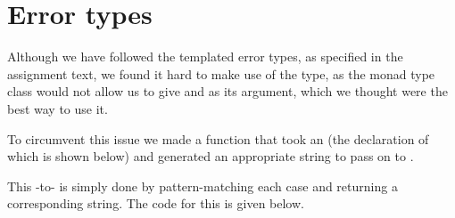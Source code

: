 \section{Error types}
Although we have followed the templated error types, as specified in the
assignment text, we found it hard to make use of the  type, as the
monad type class would not allow us to give  and  as
its argument, which we thought were the best way to use it.

To circumvent this issue we made a function that took an  (the
declaration of which is shown below) and generated an appropriate string to
pass on to .

This -to- is simply done by pattern-matching
each case and returning a corresponding string. The code for this is given
below.

